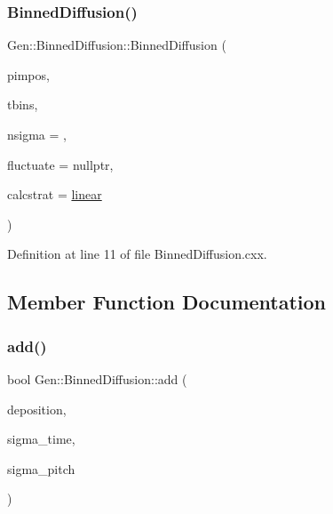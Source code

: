 \subsubsection{\texorpdfstring{Binned\+Diffusion()}{BinnedDiffusion()}}
{\footnotesize\ttfamily Gen\+::\+Binned\+Diffusion\+::\+Binned\+Diffusion (\begin{DoxyParamCaption}\item[{const \hyperlink{class_wire_cell_1_1_pimpos}{Pimpos} \&}]{pimpos,  }\item[{const \hyperlink{class_wire_cell_1_1_binning}{Binning} \&}]{tbins,  }\item[{double}]{nsigma = {},  }\item[{\hyperlink{class_wire_cell_1_1_interface_a09c548fb8266cfa39afb2e74a4615c37}{I\+Random\+::pointer}}]{fluctuate = {\ttfamily nullptr},  }\item[{\hyperlink{class_wire_cell_1_1_gen_1_1_binned_diffusion_a96d624fc75e70453e7e29c381850d218}{Impact\+Data\+Calculation\+Strategy}}]{calcstrat = {\ttfamily \hyperlink{class_wire_cell_1_1_gen_1_1_binned_diffusion_a96d624fc75e70453e7e29c381850d218a6079f954d643f93c2c08d58967c21e0e}{linear}} }\end{DoxyParamCaption})}



Definition at line 11 of file Binned\+Diffusion.\+cxx.



\subsection{Member Function Documentation}
\mbox{\label{class_wire_cell_1_1_gen_1_1_binned_diffusion_a9c4c6664c76ad07ad29d71bdb8fb92f1}} 
\subsubsection{\texorpdfstring{add()}{add()}\hspace{0.1cm}{\footnotesize\ttfamily [1/2]}}
{\footnotesize\ttfamily bool Gen\+::\+Binned\+Diffusion\+::add (\begin{DoxyParamCaption}\item[{\hyperlink{class_wire_cell_1_1_i_data_aff870b3ae8333cf9265941eef62498bc}{I\+Depo\+::pointer}}]{deposition,  }\item[{double}]{sigma\+\_\+time,  }\item[{double}]{sigma\+\_\+pitch }\end{DoxyParamCaption})}

